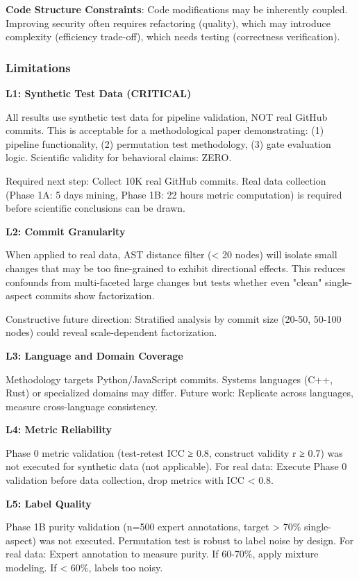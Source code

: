\textbf{Code Structure Constraints}: Code modifications may be inherently coupled. Improving security often requires refactoring (quality), which may introduce complexity (efficiency trade-off), which needs testing (correctness verification).

\subsubsection{Limitations}

\textbf{L1: Synthetic Test Data (CRITICAL)}

All results use synthetic test data for pipeline validation, NOT real GitHub commits. This is acceptable for a methodological paper demonstrating: (1) pipeline functionality, (2) permutation test methodology, (3) gate evaluation logic. Scientific validity for behavioral claims: ZERO.

Required next step: Collect 10K real GitHub commits. Real data collection (Phase 1A: 5 days mining, Phase 1B: 22 hours metric computation) is required before scientific conclusions can be drawn.

\textbf{L2: Commit Granularity}

When applied to real data, AST distance filter (< 20 nodes) will isolate small changes that may be too fine-grained to exhibit directional effects. This reduces confounds from multi-faceted large changes but tests whether even "clean" single-aspect commits show factorization.

Constructive future direction: Stratified analysis by commit size (20-50, 50-100 nodes) could reveal scale-dependent factorization.

\textbf{L3: Language and Domain Coverage}

Methodology targets Python/JavaScript commits. Systems languages (C++, Rust) or specialized domains may differ. Future work: Replicate across languages, measure cross-language consistency.

\textbf{L4: Metric Reliability}

Phase 0 metric validation (test-retest ICC ≥ 0.8, construct validity r ≥ 0.7) was not executed for synthetic data (not applicable). For real data: Execute Phase 0 validation before data collection, drop metrics with ICC < 0.8.

\textbf{L5: Label Quality}

Phase 1B purity validation (n=500 expert annotations, target > 70\% single-aspect) was not executed. Permutation test is robust to label noise by design. For real data: Expert annotation to measure purity. If 60-70\%, apply mixture modeling. If < 60\%, labels too noisy.

